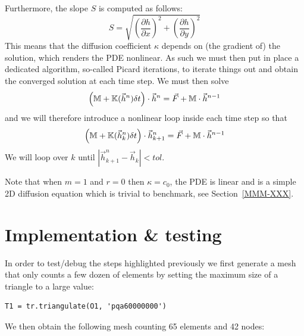 Furthermore, the slope $S$ is computed as follows:
\[
S=\sqrt{ \left(\frac{\partial h}{\partial x} \right)^2 + \left(\frac{\partial h}{\partial y} \right)^2 } 
\]
This means that the diffusion coefficient $\kappa$ depends on (the gradient of) the solution,
which renders the PDE nonlinear. As such we must then put in place a dedicated algorithm, 
so-called Picard iterations, to iterate things out and obtain the converged solution at each 
time step.
We must then solve 
\[
\left({\mathbb{M}}  + {\mathbb{K}}(\vec{h}^n) \delta t \right) \cdot \vec{h}^n = \vec{F}  + {\mathbb{M}} \cdot \vec{h}^{n-1}
\]
and we will therefore introduce a nonlinear loop inside each time step so that
\[
\left({\mathbb{M}}  + {\mathbb{K}}(\vec{h}^n_k) \delta t \right) \cdot \vec{h}^n_{k+1} = \vec{F}  + {\mathbb{M}} \cdot \vec{h}^{n-1}
\]
We will loop over $k$ until $|\vec{h}_{k+1}^n-\vec{h}_k|<tol$.

Note that when $m=1$ and $r=0$ then $\kappa=c_0$, the PDE is linear and is a 
simple 2D diffusion equation which is trivial to benchmark, see Section~\ref{MMM-XXX}.






\newpage
\section*{Implementation \& testing}

In order to test/debug the steps highlighted previously we first generate a mesh that only
counts a few dozen of elements by setting the maximum size of a triangle to a large value:
\begin{lstlisting}
T1 = tr.triangulate(O1, 'pqa60000000')
\end{lstlisting}
We then obtain the following mesh counting 65 elements and 42 nodes:

